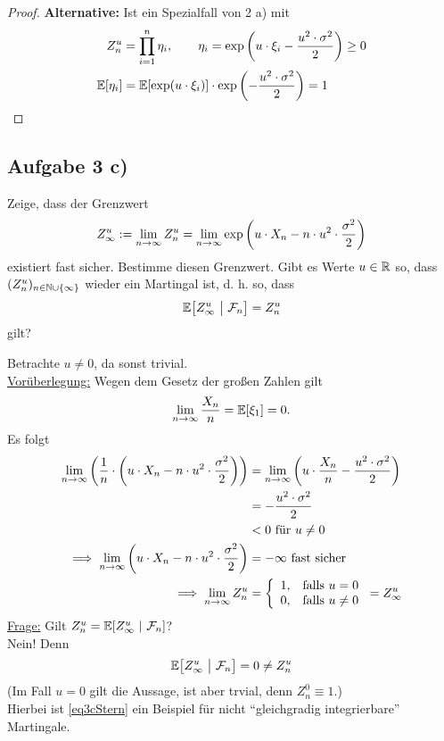 \documentclass[12pt,a4paper]{article}
\begin{document}
\begin{proof}
\textbf{Alternative:} Ist ein Spezialfall von 2 a) mit
\begin{align*}
Z_n^u&=\prod\limits_{i=1}^n\eta_i,\qquad\eta_i=\exp\left(u\cdot\xi_i-\frac{u^2\cdot\sigma^2}{2}\right)\geq0\\
\mathbb{E}[\eta_i]&=\mathbb{E}[\exp(u\cdot\xi_i)]\cdot\exp\left(-\frac{u^2\cdot\sigma^2}{2}\right)=1
\end{align*}
\end{proof}

\subsection*{Aufgabe 3 c)}
Zeige, dass der Grenzwert
\begin{align*}
Z_\infty^u:=\lim\limits_{n\to\infty} Z^u_n=\lim\limits_{n\to\infty}\exp\left(u\cdot X_n-n\cdot u^2\cdot\frac{\sigma^2}{2}\right)
\end{align*}
existiert fast sicher. Bestimme diesen Grenzwert. Gibt es Werte $u\in\mathbb{R}$ so, dass $(Z_n^u)_{n\in\mathbb{N}\cup\lbrace\infty\rbrace}$ wieder ein Martingal ist, d. h. so, dass
\begin{align*}
\mathbb{E}\big[Z^u_\infty~\big|~\mathcal{F}_n\big]=Z^u_n
\end{align*}
gilt?

\begin{lösung}
Betrachte $u\neq0$, da sonst trivial.\\

\underline{Vorüberlegung:}
Wegen dem Gesetz der großen Zahlen gilt
\begin{align*}
\lim\limits_{n\to\infty}\frac{X_n}{n}=\mathbb{E}[\xi_1]=0.
\end{align*}
Es folgt
\begin{align*}
\lim\limits_{n\to\infty}\left(\frac{1}{n}\cdot\left( u\cdot X_n-n\cdot u^2\cdot\frac{\sigma^2}{2}\right)\right)
&=\lim\limits_{n\to\infty}\left(u\cdot\frac{X_n}{n}-\frac{u^2\cdot\sigma^2}{2}\right)\\
&=-\frac{u^2\cdot\sigma^2}{2}\\
&<0\text{ für }u\neq0\\
\implies
\lim\limits_{n\to\infty}\left( u\cdot X_n-n\cdot u^2\cdot\frac{\sigma^2}{2}\right)&=-\infty\text{ fast sicher }\\
\implies
\lim\limits_{n\to\infty} Z_n^u&=\left\lbrace\begin{array}{cl}
1, & \text{falls } u=0\\
0, & \text{falls } u\neq 0
\end{array}\right.
=Z_\infty^u
\end{align*}
\underline{Frage:} Gilt $Z_n^u=\mathbb{E}[Z_\infty^u~|~\mathcal{F}_n]$?\\
Nein! Denn 
\begin{align}\label{eq3cStern}
\mathbb{E}\big[Z_\infty^u~\big|~\mathcal{F}_n\big]=0\neq Z_n^u
\end{align}
(Im Fall $u=0$ gilt die Aussage, ist aber trvial, denn $Z_n^0\equiv 1$.)\\
Hierbei ist \eqref{eq3cStern} ein Beispiel für nicht ``gleichgradig integrierbare'' Martingale.
\end{lösung}
\end{document}
